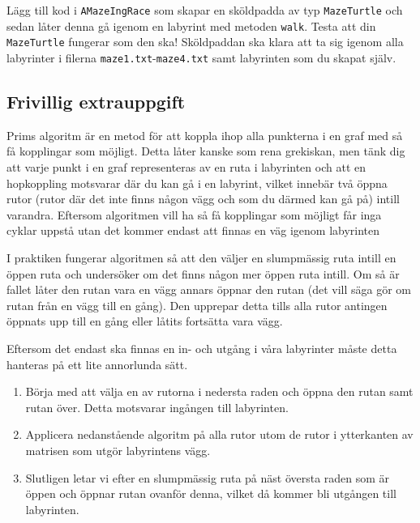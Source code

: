 \Subtask Lägg till kod i \texttt{AMazeIngRace} som skapar en sköldpadda av typ \texttt{MazeTurtle} och sedan låter denna gå igenom en labyrint med metoden \texttt{walk}. Testa att din \texttt{MazeTurtle} fungerar som den ska! Sköldpaddan ska klara att ta sig igenom alla labyrinter i filerna \texttt{maze1.txt}-\texttt{maze4.txt} samt labyrinten som du skapat själv.


\subsection{Frivillig extrauppgift}


Prims algoritm är en metod för att koppla ihop alla punkterna i en graf med så få kopplingar som möjligt. Detta låter kanske som rena grekiskan, men tänk dig att varje punkt i en graf representeras av en ruta i labyrinten och att en hopkoppling motsvarar där du kan gå i en labyrint, vilket innebär två öppna rutor (rutor där det inte finns någon vägg och som du därmed kan gå på) intill varandra. Eftersom algoritmen vill ha så få kopplingar som möjligt får inga cyklar uppstå utan det kommer endast att finnas en väg igenom labyrinten

I praktiken fungerar algoritmen så att den väljer en slumpmässig ruta intill en öppen ruta och undersöker om det finns någon mer öppen ruta intill. Om så är fallet låter den rutan vara en vägg annars öppnar den rutan (det vill säga gör om  rutan från en vägg till en gång). Den upprepar detta tills alla rutor antingen öppnats upp till en gång eller låtits fortsätta vara vägg.

Eftersom det endast ska finnas en in- och utgång i våra labyrinter måste detta hanteras på ett lite annorlunda sätt.

\begin{enumerate}
	\item Börja med att välja en av rutorna i nedersta raden och öppna den rutan samt rutan över. Detta motsvarar ingången till labyrinten.
	\item Applicera nedanstående algoritm på alla rutor utom de rutor i ytterkanten av matrisen som utgör labyrintens vägg.
	\item Slutligen letar vi efter en slumpmässig ruta på näst översta raden som är öppen och öppnar rutan ovanför denna, vilket då kommer bli utgången till labyrinten.
\end{enumerate}

